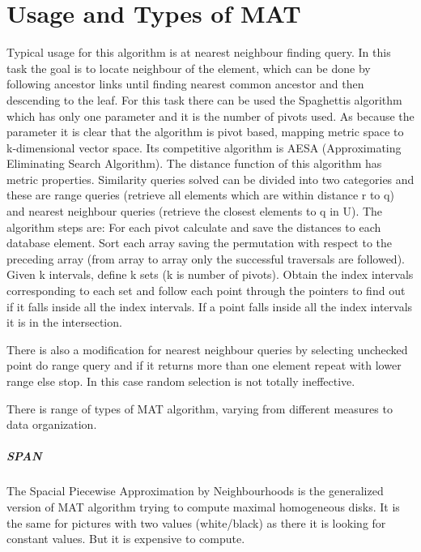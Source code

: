 \chapter{Usage and Types of MAT}\label{appendixMAT}
Typical usage for this algorithm is at nearest neighbour finding query.
In this task the goal is to locate neighbour of the element, which can be done by following ancestor links until finding nearest common ancestor and then descending to the leaf.
For this task there can be used the Spaghettis algorithm \cite{spaghettis} which has only one parameter and it is the number of pivots used. As because the parameter it is clear that the algorithm is pivot based, mapping metric space to k-dimensional vector space. Its competitive algorithm is AESA (Approximating Eliminating Search Algorithm). The distance function of this algorithm has metric properties. Similarity queries solved can be divided into two categories and these are range queries (retrieve all elements which are within distance r to q) and nearest neighbour queries (retrieve the closest elements to q in U). The algorithm steps are: For each pivot calculate and save the distances to each database element. Sort each array saving the permutation with respect to the preceding array (from array to array only the successful traversals are followed). Given k intervals, define k sets (k is number of pivots). Obtain the index intervals corresponding to each set and follow each point through the pointers to find out if it falls inside all the index intervals. If a point falls inside all the index intervals it is in the intersection.

There is also a modification for nearest neighbour queries by selecting unchecked point do range query and if it returns more than one element repeat with lower range else stop. In this case random selection is not totally ineffective.

There is range of types of MAT algorithm, varying from different measures to data organization.
\paragraph{SPAN}
The Spacial Piecewise Approximation by Neighbourhoods is the generalized version of MAT algorithm trying to compute maximal homogeneous disks. It is the same for pictures with two values (white/black) as there it is looking for constant values. But it is expensive to compute.
